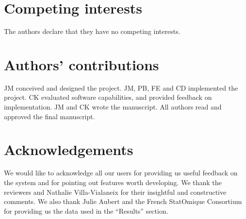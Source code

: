 \documentclass[11pt]{bmc_article_s50}
\begin{document}
\section*{Competing interests}
The authors declare that they have no competing interests.

\section*{Authors' contributions}
JM conceived and designed the project. JM, PB, FE and CD implemented the project.
CK evaluated software capabilities, and provided feedback on implementation. JM
and CK wrote the manuscript. All authors read and approved the final manuscript.

\section*{Acknowledgements}
We would like to acknowledge all our users for providing us useful feedback on
the system and for pointing out features worth developing. We thank the
reviewers and Nathalie Villa-Vialaneix for their insightful and constructive
comments. We also thank Julie Aubert and the French StatOmique Consortium for
providing us the data used in the ``Results'' section.
{\pagebreak} 
\end{document}
